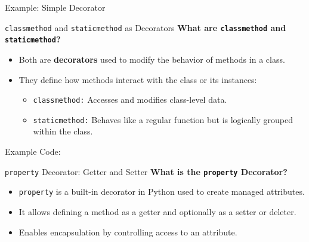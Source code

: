 \documentclass[10pt]{beamer}
\let\olditem\item
\renewcommand\item{\olditem\justifying}
\newcommand{\mypause}{\pause}
\begin{document}
	
	\begin{frame}[fragile]{Example: Simple Decorator}
	
	
	\mypause
	
	
	
	\mypause
	
	
		
	\end{frame}
	
	\begin{frame}{\texttt{classmethod} and \texttt{staticmethod} as Decorators}
		\textbf{What are \texttt{classmethod} and \texttt{staticmethod}?}
		\begin{itemize}
			\item Both are \textbf{decorators} used to modify the behavior of methods in a class.
			\item They define how methods interact with the class or its instances:
			\begin{itemize}
				\item \texttt{classmethod:} Accesses and modifies class-level data.
				\item \texttt{staticmethod:} Behaves like a regular function but is logically grouped within the class.
			\end{itemize}
		\end{itemize}
	\end{frame}
		
	\begin{frame}[fragile]{Example Code:}
		
	\end{frame}
	
	
	\begin{frame}{\texttt{property} Decorator: Getter and Setter}
		\textbf{What is the \texttt{property} Decorator?}
		\begin{itemize}
			\item \texttt{property} is a built-in decorator in Python used to create managed attributes.
			\item It allows defining a method as a getter and optionally as a setter or deleter.
			\item Enables encapsulation by controlling access to an attribute.
		\end{itemize}
	\end{frame}
	
\end{document}
